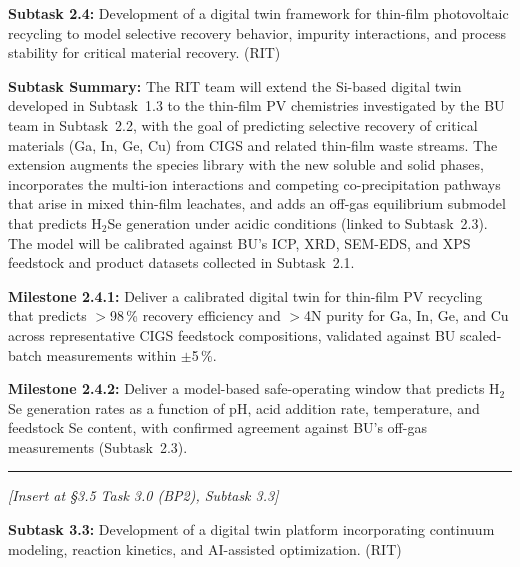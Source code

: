 \documentclass[11pt]{article}
\begin{document}
\noindent\textbf{Subtask 2.4:} Development of a digital twin framework
for thin-film photovoltaic recycling to model selective recovery
behavior, impurity interactions, and process stability for critical
material recovery. (RIT)\par

\noindent\textbf{Subtask Summary:} The RIT team will extend the
Si-based digital twin developed in Subtask~1.3 to the thin-film PV
chemistries investigated by the BU team in Subtask~2.2, with the goal
of predicting selective recovery of critical materials (Ga, In, Ge,
Cu) from CIGS and related thin-film waste streams. The extension
augments the species library with the new soluble and solid phases,
incorporates the multi-ion interactions and competing co-precipitation
pathways that arise in mixed thin-film leachates, and adds an off-gas
equilibrium submodel that predicts H$_2$Se generation under acidic
conditions (linked to Subtask~2.3). The model will be calibrated
against BU's ICP, XRD, SEM-EDS, and XPS feedstock and product
datasets collected in Subtask~2.1.\par

\noindent\textbf{Milestone 2.4.1:} Deliver a calibrated digital twin
for thin-film PV recycling that predicts $>$98\,\% recovery efficiency
and $>$4N purity for Ga, In, Ge, and Cu across representative CIGS
feedstock compositions, validated against BU scaled-batch
measurements within $\pm$5\,\%.\par

\noindent\textbf{Milestone 2.4.2:} Deliver a model-based safe-operating
window that predicts H$_2$Se generation rates as a function of pH, acid
addition rate, temperature, and feedstock Se content, with confirmed
agreement against BU's off-gas measurements (Subtask~2.3).

\vspace{1em}\noindent\rule{0.4\textwidth}{0.4pt}\vspace{0.6em}


\noindent\textit{[Insert at \S3.5 Task 3.0 (BP2), Subtask 3.3]}\par

\noindent\textbf{Subtask 3.3:} Development of a digital twin platform
incorporating continuum modeling, reaction kinetics, and AI-assisted
optimization. (RIT)\par
\end{document}
